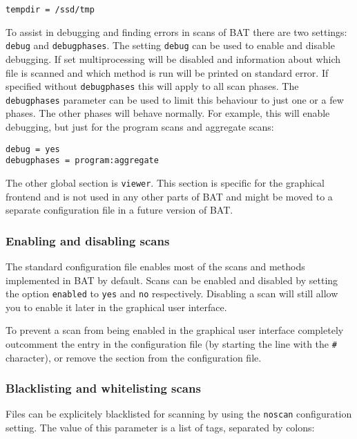 \documentclass[10pt]{article}
\begin{document}
\begin{verbatim}
tempdir = /ssd/tmp
\end{verbatim}

To assist in debugging and finding errors in scans of BAT there are two
settings: \texttt{debug} and \texttt{debugphases}. The setting \texttt{debug}
can be used to enable and disable debugging. If set multiprocessing will be
disabled and information about which file is scanned and which method is run
will be printed on standard error. If specified without \texttt{debugphases}
this will apply to all scan phases. The \texttt{debugphases} parameter can be
used to limit this behaviour to just one or a few phases. The other phases will
behave normally. For example, this will enable debugging, but just for the
program scans and aggregate scans:

\begin{verbatim}
debug = yes
debugphases = program:aggregate
\end{verbatim}

The other global section is \texttt{viewer}. This section is specific for the
graphical frontend and is not used in any other parts of BAT and might be moved
to a separate configuration file in a future version of BAT.

\subsubsection{Enabling and disabling scans}

The standard configuration file enables most of the scans and methods
implemented in BAT by default. Scans can be enabled and disabled by setting the
option \texttt{enabled} to \texttt{yes} and \texttt{no} respectively. Disabling
a scan will still allow you to enable it later in the graphical user interface.

To prevent a scan from being enabled in the graphical user interface completely
outcomment the entry in the configuration file (by starting the line with the
\texttt{\#} character), or remove the section from the configuration file.

\subsubsection{Blacklisting and whitelisting scans}

Files can be explicitely blacklisted for scanning by using the \texttt{noscan}
configuration setting. The value of this parameter is a list of tags, separated
by colons:
\end{document}
